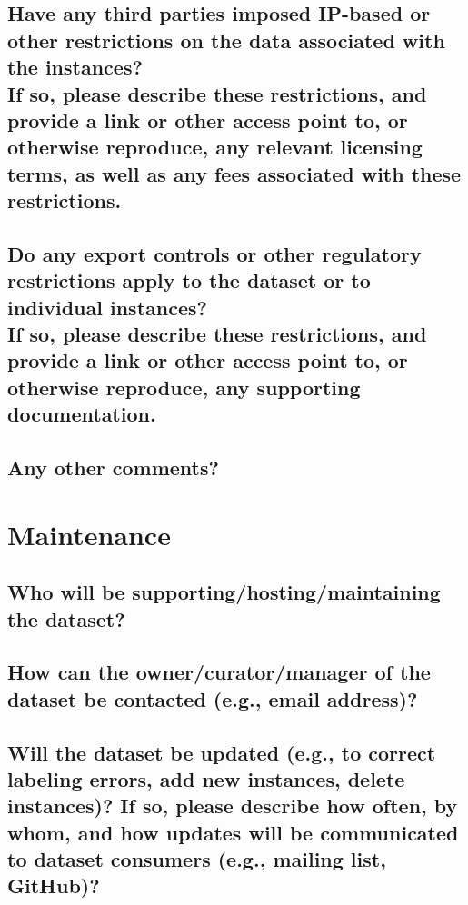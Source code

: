 \documentclass[letterpaper, 10 pt, conference]{ieeeconf}  %
\newcommand{\subtitle}[1]{{\\ \small \normalfont \color{purple} #1}}
\begin{document}
\lipsum[1]

\subsection{Have any third parties imposed IP-based or other restrictions on the data associated with the instances? \subtitle{If so, please describe these restrictions, and provide a link or other access point to, or otherwise reproduce, any relevant licensing terms, as well as any fees associated with these restrictions.}}

\lipsum[1]

\subsection{Do any export controls or other regulatory restrictions apply to the dataset or to individual instances? \subtitle{If so, please describe these restrictions, and provide a link or other access point to, or otherwise reproduce, any supporting documentation.}}

\lipsum[1]

\subsection{Any other comments?}

\section{Maintenance}

\subsection{Who will be supporting/hosting/maintaining the dataset?}

\lipsum[1]

\subsection{How can the owner/curator/manager of the dataset be contacted (e.g., email address)?}

\lipsum[1]

\subsection{Will the dataset be updated (e.g., to correct labeling errors, add new instances, delete instances)? If so, please describe how often, by whom, and how updates will be communicated to dataset consumers (e.g., mailing list, GitHub)?}
\end{document}
